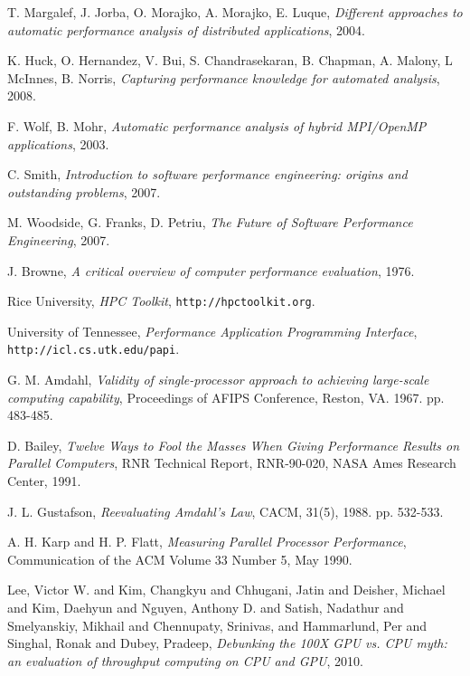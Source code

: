 \documentclass[a4paper]{report}
\begin{document}
\begin{thebibliography}{9}
  T. Margalef, J. Jorba, O. Morajko, A. Morajko, E. Luque,
  \emph{Different approaches to automatic performance analysis of distributed
    applications},
  2004.
  
  K. Huck, O. Hernandez, V. Bui, S. Chandrasekaran, B. Chapman, A. Malony,
  L McInnes, B. Norris,
  \emph{Capturing performance knowledge for automated analysis},
  2008.
  
  F. Wolf, B. Mohr,
  \emph{Automatic performance analysis of hybrid MPI/OpenMP applications},
  2003.
  
  C. Smith,
  \emph{Introduction to software performance engineering: origins and
    outstanding problems},
  2007.

  M. Woodside, G. Franks, D. Petriu,
  \emph{The Future of Software Performance Engineering},
  2007.

  J. Browne,
  \emph{A critical overview of computer performance evaluation},
  1976.

  Rice University,
  \emph{HPC Toolkit}, {\tt http://hpctoolkit.org}.
       
  University of Tennessee,
  \emph{Performance Application Programming Interface},
       {\tt http://icl.cs.utk.edu/papi}.
       
  G. M. Amdahl,
  \emph{Validity of single-processor approach to achieving large-scale
    computing capability},
  Proceedings of AFIPS Conference, Reston, VA. 1967. pp. 483-485.
  
  D. Bailey, \emph{Twelve Ways to Fool the Masses When Giving Performance
    Results on Parallel Computers},
  RNR Technical Report, RNR-90-020, NASA Ames Research Center, 1991.
  
  J. L. Gustafson,
  \emph{Reevaluating Amdahl's Law}, CACM, 31(5), 1988. pp. 532-533.
  
  A. H. Karp and H. P. Flatt,
  \emph{Measuring Parallel Processor Performance},
  Communication of the ACM Volume 33 Number 5, May 1990.
  
  {Lee, Victor W. and Kim, Changkyu and Chhugani, Jatin and Deisher, Michael
    and Kim, Daehyun and Nguyen, Anthony D. and Satish, Nadathur and
    Smelyanskiy, Mikhail and Chennupaty}, Srinivas, and Hammarlund, Per and
  Singhal, Ronak and Dubey, Pradeep,
  \emph{Debunking the 100X GPU vs. CPU myth: an evaluation of throughput
    computing on CPU and GPU},
  2010.
  

\end{thebibliography}
\end{document}
